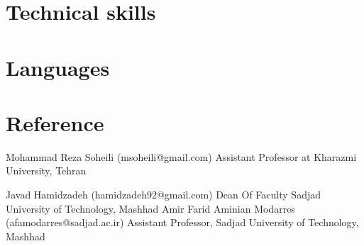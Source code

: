 \documentclass[letterpaper]{moderncv}        %
\begin{document}
\section{Technical skills}

\section{Languages}


\section{Reference}

\cventry
{}
{Mohammad Reza Soheili}
{(msoheili@gmail.com)}
{}
{}
{Assistant Professor at Kharazmi University, Tehran}


\cventry
{}
{Javad Hamidzadeh}
{(hamidzadeh92@gmail.com)}
{}
{}
{Dean Of Faculty Sadjad University of Technology, Mashhad}
\cventry
{}
{Amir Farid Aminian Modarres}
{(afamodarres@sadjad.ac.ir)}
{}
{}
{Assistant Professor, Sadjad University of Technology, Mashhad}
\end{document}
